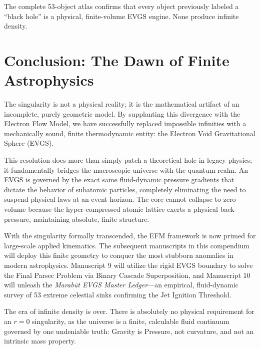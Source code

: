 \documentclass[11pt, a4paper]{article}
\begin{document}
  The complete 53-object atlas \cite{marabut2026m5} confirms that every object previously labeled a ``black hole'' is a physical, finite-volume EVGS engine. None produce infinite density.

\clearpage
\section{Conclusion: The Dawn of Finite Astrophysics}
  The singularity is not a physical reality; it is the mathematical artifact of an incomplete, purely geometric model. By supplanting this divergence with the Electron Flow Model, we have successfully replaced impossible infinities with a mechanically sound, finite thermodynamic entity: the Electron Void Gravitational Sphere (EVGS). 
  
  This resolution does more than simply patch a theoretical hole in legacy physics; it fundamentally bridges the macroscopic universe with the quantum realm. An EVGS is governed by the exact same fluid-dynamic pressure gradients that dictate the behavior of subatomic particles, completely eliminating the need to suspend physical laws at an event horizon. The core cannot collapse to zero volume because the hyper-compressed atomic lattice exerts a physical back-pressure, maintaining absolute, finite structure.

  With the singularity formally transcended, the EFM framework is now primed for large-scale applied kinematics. The subsequent manuscripts in this compendium will deploy this finite geometry to conquer the most stubborn anomalies in modern astrophysics. Manuscript 9 will utilize the rigid EVGS boundary to solve the Final Parsec Problem via Binary Cascade Superposition, and Manuscript 10 will unleash the \textit{Marab\={u}t EVGS Master Ledger}---an empirical, fluid-dynamic survey of 53 extreme celestial sinks confirming the Jet Ignition Threshold. 
  
  The era of infinite density is over. There is absolutely no physical requirement for an $r=0$ singularity, as the universe is a finite, calculable fluid continuum governed by one undeniable truth: Gravity is Pressure, not curvature, and not an intrinsic mass property.

\clearpage
\end{document}
